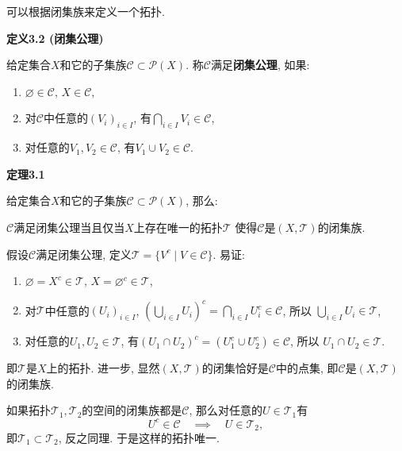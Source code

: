 \documentclass[UTF8]{ctexart}
\begin{document}
可以根据闭集族来定义一个拓扑.

\vspace{10pt}

\hypertarget{sec:定义3.2}{}
\noindent\textbf{定义3.2 (闭集公理)}

给定集合$X$和它的子集族$\mathcal{C}\subset\mathcal{P}(X)$.
称$\mathcal{C}$满足\textbf{闭集公理}, 如果:
\begin{enumerate}
    \item $\varnothing\in\mathcal{C},\,X\in\mathcal{C}$,
    \item 对$\mathcal{C}$中任意的$(V_i)_{i\in I}$,
    有$\displaystyle\bigcap_{i\in I}V_i\in\mathcal{C}$,
    \vspace{3pt}
    \item 对任意的$V_1,V_2\in\mathcal{C}$, 有$V_1\cup V_2\in\mathcal{C}$.
\end{enumerate}

\vspace{10pt}

\hypertarget{sec:定理3.1}{}
\noindent\textbf{定理3.1}

给定集合$X$和它的子集族$\mathcal{C}\subset\mathcal{P}(X)$, 那么:

$\mathcal{C}$满足闭集公理当且仅当$X$上存在唯一的拓扑$\mathcal{T}$
使得$\mathcal{C}$是$(X,\mathcal{T})$的闭集族.



假设$\mathcal{C}$满足闭集公理, 定义$\mathcal{T}=\{V^c\mid V\in\mathcal{C}\}$. 易证:
\begin{enumerate}
    \item $\varnothing=X^c\in\mathcal{T},\,X=\varnothing^c\in\mathcal{T}$,
    \vspace{3pt}
    \item 对$\mathcal{T}$中任意的$(U_i)_{i\in I}$,
    $\displaystyle\left(\bigcup_{i\in I}U_i\right)^c
    =\bigcap_{i\in I}U_i^c\in\mathcal{C}$, 所以
    $\displaystyle\bigcup_{i\in I}U_i\in\mathcal{T}$,
    \vspace{3pt}
    \item 对任意的$U_1,U_2\in\mathcal{T}$,
    有$(U_1\cap U_2)^c=(U_1^c\cup U_2^c)\in\mathcal{C}$, 所以
    $U_1\cap U_2\in\mathcal{T}$.
\end{enumerate}
即$\mathcal{T}$是$X$上的拓扑.
进一步, 显然$(X,\mathcal{T})$的闭集恰好是$\mathcal{C}$中的点集,
即$\mathcal{C}$是$(X,\mathcal{T})$的闭集族.

如果拓扑$\mathcal{T}_1,\mathcal{T}_2$的空间的闭集族都是$\mathcal{C}$,
那么对任意的$U\in\mathcal{T}_1$有
\[
    U^c\in\mathcal{C}\quad\implies\quad U\in\mathcal{T}_2,
\]
即$\mathcal{T}_1\subset\mathcal{T}_2$, 反之同理. 于是这样的拓扑唯一.
\end{document}
